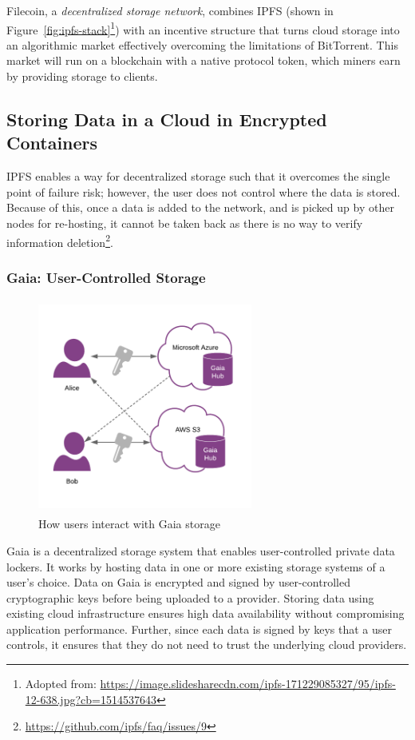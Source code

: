 			Filecoin\cite{benet2018filecoin}, a \textit{decentralized storage network}, combines IPFS (shown in Figure~\ref{fig:ipfs-stack}\footnote{Adopted from: \url{https://image.slidesharecdn.com/ipfs-171229085327/95/ipfs-12-638.jpg?cb=1514537643}}) with an incentive structure that turns cloud storage into an algorithmic market effectively overcoming the limitations of BitTorrent. This market will run on a blockchain with a native protocol token, which miners earn by providing storage to clients.
		
	\subsection{Storing Data in a Cloud in Encrypted Containers}
		IPFS enables a way for decentralized storage such that it overcomes the single point of failure risk; however, the user does not control where the data is stored. Because of this, once a data is added to the network, and is picked up by other nodes for re-hosting, it cannot be taken back as there is no way to verify information deletion\footnote{\url{https://github.com/ipfs/faq/issues/9}}.
		
		\subsubsection{Gaia: User-Controlled Storage}\label{sec:blockstack-gaia}
		\begin{figure}[h]
			\centering
			\includegraphics[width=200pt, height=200pt]{figures/gaia-storage}
			\caption{\label{fig:gaia-storage} How users interact with Gaia storage\protect\footnotemark}
		\end{figure}
		
		Gaia\cite{ali2016blockstack} is a decentralized storage system that enables user-controlled private data lockers. It works by hosting data in one or more existing storage systems of a user's choice. Data on Gaia is encrypted and signed by user-controlled cryptographic keys before being uploaded to a provider. Storing data using existing cloud infrastructure ensures high data availability without compromising application performance. Further, since each data is signed by keys that a user controls, it ensures that they do not need to trust the underlying cloud providers.
		
